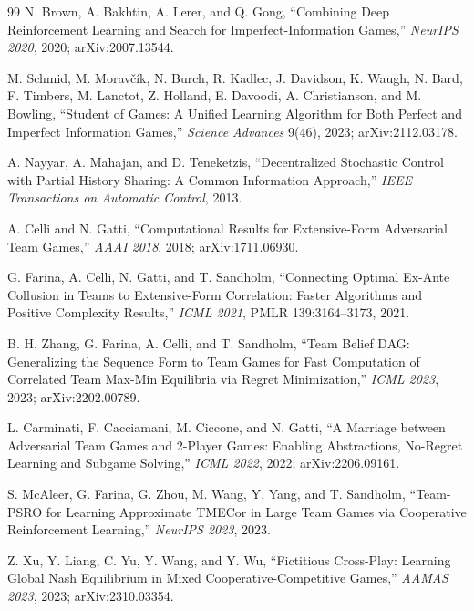 \documentclass[11pt]{article}
\theoremstyle{definition}
\begin{document}
\begin{thebibliography}{99}
N. Brown, A. Bakhtin, A. Lerer, and Q. Gong, ``Combining Deep Reinforcement
Learning and Search for Imperfect-Information Games,'' \emph{NeurIPS 2020},
2020; arXiv:2007.13544.

M. Schmid, M. Morav\v{c}\'ik, N. Burch, R. Kadlec, J. Davidson, K. Waugh,
N. Bard, F. Timbers, M. Lanctot, Z. Holland, E. Davoodi, A. Christianson, and
M. Bowling, ``Student of Games: A Unified Learning Algorithm for Both Perfect
and Imperfect Information Games,'' \emph{Science Advances} 9(46), 2023;
arXiv:2112.03178.

A. Nayyar, A. Mahajan, and D. Teneketzis, ``Decentralized Stochastic Control
with Partial History Sharing: A Common Information Approach,'' \emph{IEEE
Transactions on Automatic Control}, 2013.

A. Celli and N. Gatti, ``Computational Results for Extensive-Form Adversarial
Team Games,'' \emph{AAAI 2018}, 2018; arXiv:1711.06930.

G. Farina, A. Celli, N. Gatti, and T. Sandholm, ``Connecting Optimal Ex-Ante
Collusion in Teams to Extensive-Form Correlation: Faster Algorithms and Positive
Complexity Results,'' \emph{ICML 2021}, PMLR 139:3164--3173, 2021.

B. H. Zhang, G. Farina, A. Celli, and T. Sandholm, ``Team Belief DAG:
Generalizing the Sequence Form to Team Games for Fast Computation of Correlated
Team Max-Min Equilibria via Regret Minimization,'' \emph{ICML 2023}, 2023;
arXiv:2202.00789.

L. Carminati, F. Cacciamani, M. Ciccone, and N. Gatti, ``A Marriage between
Adversarial Team Games and 2-Player Games: Enabling Abstractions, No-Regret
Learning and Subgame Solving,'' \emph{ICML 2022}, 2022; arXiv:2206.09161.

S. McAleer, G. Farina, G. Zhou, M. Wang, Y. Yang, and T. Sandholm, ``Team-PSRO
for Learning Approximate TMECor in Large Team Games via Cooperative
Reinforcement Learning,'' \emph{NeurIPS 2023}, 2023.

Z. Xu, Y. Liang, C. Yu, Y. Wang, and Y. Wu, ``Fictitious Cross-Play: Learning
Global Nash Equilibrium in Mixed Cooperative-Competitive Games,''
\emph{AAMAS 2023}, 2023; arXiv:2310.03354.



\end{thebibliography}
\end{document}
